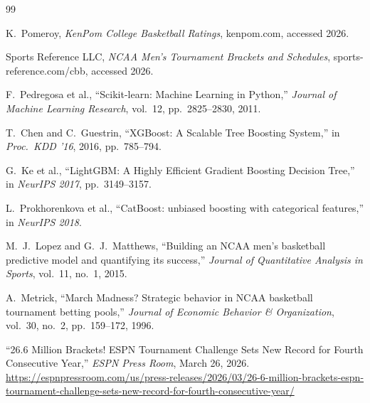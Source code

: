 \documentclass[12pt]{article}
\begin{document}
\begin{thebibliography}{99}

K.\ Pomeroy, \emph{KenPom College Basketball Ratings}, kenpom.com, accessed 2026.

Sports Reference LLC, \emph{NCAA Men's Tournament Brackets and Schedules}, sports-reference.com/cbb, accessed 2026.

F.\ Pedregosa et al., ``Scikit-learn: Machine Learning in Python,'' \emph{Journal of Machine Learning Research}, vol.\ 12, pp.\ 2825--2830, 2011.

T.\ Chen and C.\ Guestrin, ``XGBoost: A Scalable Tree Boosting System,'' in \emph{Proc.\ KDD '16}, 2016, pp.\ 785--794.

G.\ Ke et al., ``LightGBM: A Highly Efficient Gradient Boosting Decision Tree,'' in \emph{NeurIPS 2017}, pp.\ 3149--3157.

L.\ Prokhorenkova et al., ``CatBoost: unbiased boosting with categorical features,'' in \emph{NeurIPS 2018}.

M.\ J.\ Lopez and G.\ J.\ Matthews, ``Building an NCAA men's basketball predictive model and quantifying its success,'' \emph{Journal of Quantitative Analysis in Sports}, vol.\ 11, no.\ 1, 2015.

A.\ Metrick, ``March Madness? Strategic behavior in NCAA basketball tournament betting pools,'' \emph{Journal of Economic Behavior \& Organization}, vol.\ 30, no.\ 2, pp.\ 159--172, 1996.

``26.6 Million Brackets! ESPN Tournament Challenge Sets New Record for Fourth Consecutive Year,'' \emph{ESPN Press Room}, March 26, 2026. \url{https://espnpressroom.com/us/press-releases/2026/03/26-6-million-brackets-espn-tournament-challenge-sets-new-record-for-fourth-consecutive-year/}

\end{thebibliography}
\end{document}
